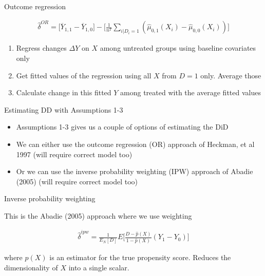 \documentclass{beamer}
\begin{document}
\begin{frame}{Outcome regression}

\begin{eqnarray*}
\widehat{\delta}^{OR} = \bigg [ \overline{Y}_{1,1} -  \overline{Y}_{1,0} \bigg ] -  \bigg [ \frac{1}{n^T} \sum_{i|D_i=1} ( \widehat{\mu}_{0,1}(X_i) - \widehat{\mu}_{0,0}(X_i)) \bigg ]
\end{eqnarray*}

\begin{enumerate}
\item Regress changes $\Delta Y$ on $X$ among untreated groups using baseline covariates only
\item Get fitted values of the regression using all $X$ from $D=1$ only.  Average those
\item Calculate change in this fitted $Y$ among treated with the average fitted values
\end{enumerate}

\end{frame}

\begin{frame}{Estimating DD with Assumptions 1-3}

\begin{itemize}
\item Assumptions 1-3 gives us a couple of options of estimating the DiD
\item We can either use the outcome regression (OR) approach of Heckman, et al 1997 (will require correct model too)
\item Or we can use the inverse probability weighting (IPW) approach of Abadie (2005) (will require correct model too)
\end{itemize}

\end{frame}


\begin{frame}{Inverse probability weighting}

This is the Abadie (2005) approach where we use weighting

\begin{eqnarray*}
\widehat{\delta}^{ipw} = \frac{1}{E_N[D]} E \bigg [ \frac{D-\widehat{p}(X)}{1-\widehat{p}(X)} (Y_1-Y_0) \bigg ]
\end{eqnarray*}

where $\widehat{p}(X)$ is an estimator for the true propensity score. Reduces the dimensionality of $X$ into a single scalar.

\end{frame}
\end{document}
